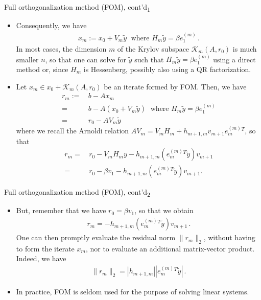 \documentclass[t,usepdftitle=false]{beamer}
\begin{document}
\begin{frame}{Full orthogonalization method (FOM), cont'd\textsubscript{1}}
\begin{itemize}
\item[] Consequently, we have 
\begin{align*}
\boxed{
x_m:=x_0+V_m\tilde{y}
\;\text{ where }
H_m\tilde{y}=\beta e_1^{(m)}
}\,.
\end{align*}
In most cases, the dimension $m$ of the Krylov subspace $\mathcal{K}_m(A,r_0)$ is much smaller $n$, so that one can solve for $\tilde{y}$ such that $H_m\tilde{y}=\beta e_1^{(m)}$ using a direct method or, since $H_m$ is Hessenberg, possibly also using a QR factorization.
\item Let $x_m\in x_0+\mathcal{K}_m(A,r_0)$ be an iterate formed by FOM.
Then, we have
\begin{align*}
r_m
:=&\,b-Ax_m\\
=&\,b-A(x_0+V_m\tilde{y})\;\text{ where }H_m\tilde{y}=\beta e_1^{(m)}\\
=&\,r_0-AV_m\tilde{y}
\end{align*}
where we recall the Arnoldi relation $AV_m=V_m H_m+h_{m+1,m}v_{m+1}e_m^{(m)}{}^T$, so that\vspace{-.4cm}
\begin{align*}
r_m
=&\,r_0-V_mH_my-h_{m+1,m}(e_m^{(m)}{}^T\tilde{y})v_{m+1}\\
=&\,r_0-\beta v_1-h_{m+1,m}(e_m^{(m)}{}^T\tilde{y})v_{m+1}.
\end{align*}
\end{itemize}
\end{frame}

\begin{frame}{Full orthogonalization method (FOM), cont'd\textsubscript{2}}
\begin{itemize}
\item[]But, remember that we have $r_0=\beta v_1$, so that we obtain
\begin{align*}
\boxed{
r_m=-h_{m+1,m}(e_m^{(m)}{}^T\tilde{y})v_{m+1}
}\,.
\end{align*}
One can then promptly evaluate the residual norm $\|r_m\|_2$, without having to form the iterate $x_m$, nor to evaluate an additional matrix-vector product.
Indeed, we have
\begin{align*}
\boxed{\|r_m\|_2=|h_{m+1,m}||e_m^{(m)}{}^T\tilde{y}|}\,.
\end{align*}
\item In practice, FOM is seldom used for the purpose of solving linear systems.
\end{itemize}
\end{frame}
\end{document}
